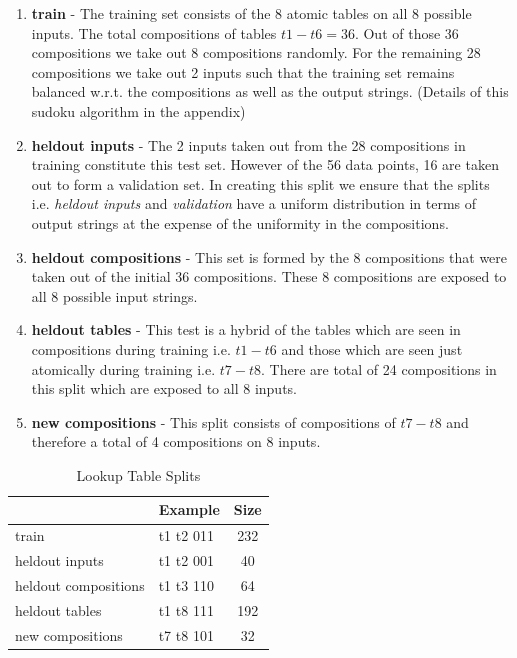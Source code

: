 \begin{enumerate}
	\item \textbf{train} - The training set consists of the 8 atomic tables on all 8 possible inputs. The total compositions of tables $t1 - t6 = 36$. Out of those 36 compositions we take out 8 compositions randomly. For the remaining 28 compositions we take out 2 inputs such that the training set remains balanced w.r.t. the compositions as well as the output strings. (Details of this sudoku algorithm in the appendix)
	\item \textbf{heldout inputs} - The 2 inputs taken out from the 28 compositions in training constitute this test set. However of the 56 data points, 16 are taken out to form a validation set. In creating this split we ensure that the splits i.e. \textit{heldout inputs} and \textit{validation} have a uniform distribution in terms of output strings at the expense of the uniformity in the compositions.
	\item \textbf{heldout compositions} - This set is formed by the 8 compositions that were taken out of the initial 36 compositions. These 8 compositions are exposed to all 8 possible input strings.
	\item \textbf{heldout tables} - This test is a hybrid of the tables which are seen in compositions during training i.e. $t1 - t6$ and those which are seen just atomically during training i.e. $t7 - t8$. There are total of 24 compositions in this split which are exposed to all 8 inputs.
	\item \textbf{new compositions} - This split consists of compositions of $t7 - t8$ and therefore a total of 4 compositions on 8 inputs.
\end{enumerate}


\begin{table}[ht]
	\centering
	\begin{tabular}{l|lc}
		& Example & Size\\
		\hline
		train & t1 t2 011 & 232 \\
		heldout inputs & t1 t2 001 & 40 \\
		heldout compositions & t1 t3 110 & 64 \\
		heldout tables & t1 t8 111 & 192 \\
		new compositions & t7 t8 101 & 32 \\
	\end{tabular}
	\caption{Lookup Table Splits}
	\label{lt:stats}
\end{table}



